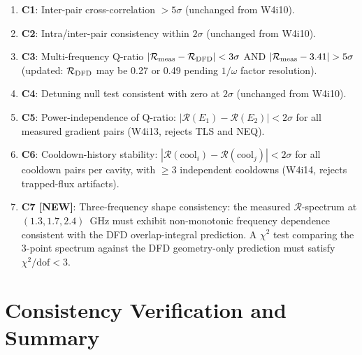 \documentclass[11pt]{article}
\theoremstyle{definition}
\theoremstyle{remark}
\begin{document}
\begin{tcolorbox}[colback=green!5!white, colframe=green!60!black,
  title=\textbf{UPDATED DETECTION CRITERIA (5$\sigma$ discovery)}]
\begin{enumerate}[label=\textbf{C\arabic*.}, itemsep=6pt]

\item \textbf{C1}: Inter-pair cross-correlation $> 5\sigma$
  (unchanged from W4i10).

\item \textbf{C2}: Intra/inter-pair consistency within $2\sigma$
  (unchanged from W4i10).

\item \textbf{C3}: Multi-frequency Q-ratio $|\mathcal{R}_{\rm meas}
  - \mathcal{R}_{\rm DFD}| < 3\sigma$ AND
  $|\mathcal{R}_{\rm meas} - 3.41| > 5\sigma$
  (updated: $\mathcal{R}_{\rm DFD}$ may be 0.27 or 0.49 pending
  $1/\omega$ factor resolution).

\item \textbf{C4}: Detuning null test consistent with zero at
  $2\sigma$ (unchanged from W4i10).

\item \textbf{C5}: Power-independence of Q-ratio:
  $|\mathcal{R}(E_1) - \mathcal{R}(E_2)| < 2\sigma$ for all
  measured gradient pairs (W4i13, rejects TLS and NEQ).

\item \textbf{C6}: Cooldown-history stability:
  $|\mathcal{R}(\text{cool}_i) - \mathcal{R}(\text{cool}_j)|
  < 2\sigma$ for all cooldown pairs per cavity, with $\geq$3
  independent cooldowns (W4i14, rejects trapped-flux artifacts).

\item \textbf{C7 [NEW]}: Three-frequency shape consistency:
  the measured $\mathcal{R}$-spectrum at $(1.3, 1.7, 2.4)$~GHz
  must exhibit non-monotonic frequency dependence consistent with
  the DFD overlap-integral prediction. A $\chi^2$ test comparing
  the 3-point spectrum against the DFD geometry-only prediction
  must satisfy $\chi^2/\text{dof} < 3$.

\end{enumerate}
\end{tcolorbox}


\part{Consistency Verification and Summary}
\label{part:summary}
\end{document}
